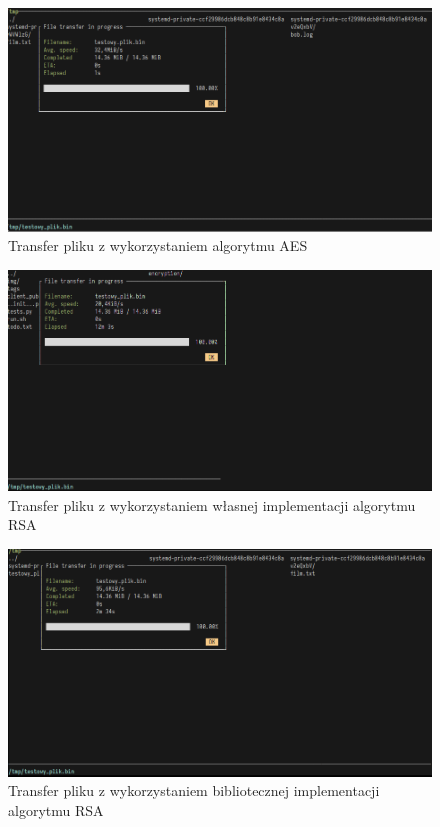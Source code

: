 \documentclass{article}
\begin{document}
    \begin{figure}[H]
        \centering
        \includegraphics[scale=0.4]{aes_cipher}
        \caption{Transfer pliku z wykorzystaniem algorytmu AES}
        \label{AES_FILE_TRANSFER}
    \end{figure}
    \begin{figure}[H]
        \centering
        \includegraphics[scale=0.4]{szacun_production_rsa}
        \caption{Transfer pliku z wykorzystaniem własnej implementacji algorytmu RSA}
        \label{SZACUN_RSA_FILE_TRANSFER}
    \end{figure}
    \begin{figure}[H]
        \centering
        \includegraphics[scale=0.4]{library_rsa_cipher}
        \caption{Transfer pliku z wykorzystaniem bibliotecznej implementacji algorytmu RSA}
        \label{LIBRARY_RSA_FILE_TRANSFER}
    \end{figure}
\end{document}
